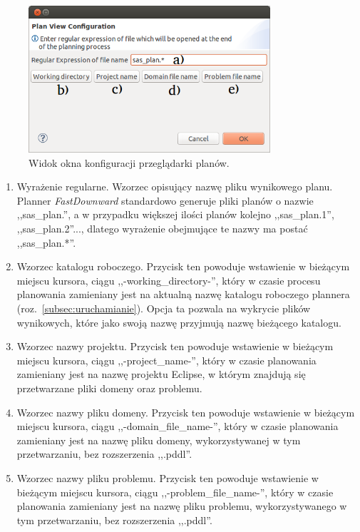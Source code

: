 \begin{enumerate}
\begin{figure}[h!]
    \centering
    \includegraphics[width=0.8\textwidth]{img/plan_view_dialog}
    \caption{Widok okna konfiguracji przeglądarki planów.}
    \label{fig:plan_view_window}
\end{figure}
\begin{enumerate}
\item Wyrażenie regularne. Wzorzec opisujący nazwę pliku wynikowego planu. Planner \textit{FastDownward} standardowo generuje pliki planów o nazwie ,,sas\_plan.'', a w przypadku większej ilości planów kolejno ,,sas\_plan.1'', ,,sas\_plan.2''..., dlatego wyrażenie obejmujące te nazwy ma postać ,,sas\_plan.*''.
\item Wzorzec katalogu roboczego. Przycisk ten powoduje wstawienie w bieżącym miejscu kursora, ciągu ,,-working\_directory-'', który w czasie procesu planowania zamieniany jest na aktualną nazwę katalogu roboczego plannera (roz.~\ref{subsec:uruchamianie}). Opcja ta pozwala na wykrycie plików wynikowych, które jako swoją nazwę przyjmują nazwę bieżącego katalogu.
\item Wzorzec nazwy projektu. Przycisk ten powoduje wstawienie w bieżącym miejscu kursora, ciągu ,,-project\_name-'', który w czasie planowania zamieniany jest na nazwę projektu Eclipse, w którym znajdują się przetwarzane pliki domeny oraz problemu.
\item Wzorzec nazwy pliku domeny. Przycisk ten powoduje wstawienie w bieżącym miejscu kursora, ciągu ,,-domain\_file\_name-'', który w czasie planowania zamieniany jest na nazwę pliku domeny, wykorzystywanej w tym przetwarzaniu, bez rozszerzenia ,,.pddl''.
\item Wzorzec nazwy pliku problemu. Przycisk ten powoduje wstawienie w bieżącym miejscu kursora, ciągu ,,-problem\_file\_name-'', który w czasie planowania zamieniany jest na nazwę pliku problemu, wykorzystywanego w tym przetwarzaniu, bez rozszerzenia ,,.pddl''.
\end{enumerate}
\end{enumerate}

